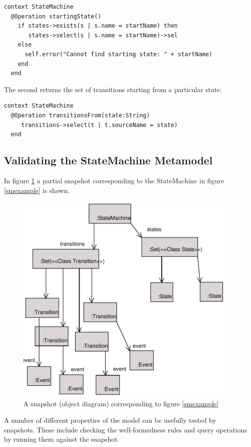 \begin{lstlisting}
context StateMachine
  @Operation startingState()
    if states->exists(s | s.name = startName) then
       states->select(s | s.name = startName)->sel
    else
      self.error("Cannot find starting state: " + startName)
    end
  end
\end{lstlisting}\noindent The second returns the set of transitions starting from a
particular state:

\begin{lstlisting}
context StateMachine
  @Operation transitionsFrom(state:String)
     transitions->select(t | t.sourceName = state)
  end
\end{lstlisting}\subsection{Validating the StateMachine Metamodel}

In figure \ref{smsnapshot} a partial snapshot corresponding to the
StateMachine in figure \ref{smexample} is shown.

\begin{figure}[htb]
\begin{center}
\includegraphics[width=11cm]{AbstractSyntax/figures/SMSnapshot.pdf}
\caption{A snapshot (object diagram) corresponding to figure
\ref{smexample}} \label{smsnapshot}
\end{center}
\end{figure}

A number of different properties of the model can be usefully
tested by snapshots. These include checking the well-formedness
rules and query operations by running them against the snapshot.

